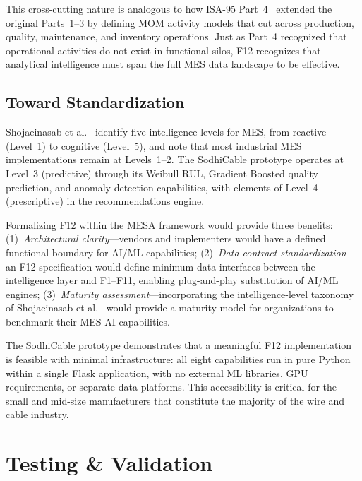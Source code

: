 \documentclass[11pt]{article}
\begin{document}
This cross-cutting nature is analogous to how ISA-95 Part~4~\cite{isa95part4} extended the original Parts~1--3 by defining MOM activity models that cut across production, quality, maintenance, and inventory operations.  Just as Part~4 recognized that operational activities do not exist in functional silos, F12 recognizes that analytical intelligence must span the full MES data landscape to be effective.


\subsection{Toward Standardization}

Shojaeinasab et al.~\cite{shojaeinasab2022} identify five intelligence levels for MES, from reactive (Level~1) to cognitive (Level~5), and note that most industrial MES implementations remain at Levels~1--2.  The SodhiCable prototype operates at Level~3 (predictive) through its Weibull RUL, Gradient Boosted quality prediction, and anomaly detection capabilities, with elements of Level~4 (prescriptive) in the recommendations engine.

Formalizing F12 within the MESA framework would provide three benefits: (1)~\textit{Architectural clarity}---vendors and implementers would have a defined functional boundary for AI/ML capabilities; (2)~\textit{Data contract standardization}---an F12 specification would define minimum data interfaces between the intelligence layer and F1--F11, enabling plug-and-play substitution of AI/ML engines; (3)~\textit{Maturity assessment}---incorporating the intelligence-level taxonomy of Shojaeinasab et al.~\cite{shojaeinasab2022} would provide a maturity model for organizations to benchmark their MES AI capabilities.

The SodhiCable prototype demonstrates that a meaningful F12 implementation is feasible with minimal infrastructure: all eight capabilities run in pure Python within a single Flask application, with no external ML libraries, GPU requirements, or separate data platforms.  This accessibility is critical for the small and mid-size manufacturers that constitute the majority of the wire and cable industry.


\section{Testing \& Validation}\label{sec:testing}
\end{document}
